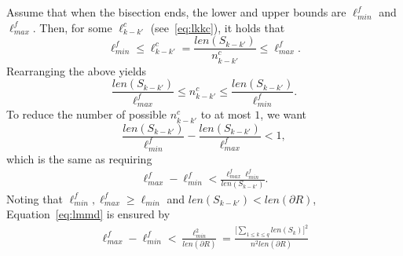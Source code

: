 Assume that when the bisection ends, the lower and upper bounds are 
$\ell_{min}^f$ and $\ell_{max}^f$. Then, for some $\ell_{k-k'}^c$
(see~\eqref{eq:lkkc}), it holds that
\[
\ell_{min}^f \le \ell_{k-k'}^c = \frac{len(S_{k-k'})}{n_{k-k'}^c} \le \ell_{max}^f.
\]
Rearranging the above yields
\[
\frac{len(S_{k-k'})}{\ell_{max}^f} \le n_{k-k'}^c \le \frac{len(S_{k-k'})}{\ell_{min}^f}.
\]
To reduce the number of possible $n_{k-k'}^c$ to at most $1$, we want 
\[
\frac{len(S_{k-k'})}{\ell_{min}^f} - \frac{len(S_{k-k'})}{\ell_{max}^f} < 1, 
\]
which is the same as requiring 
\begin{align}\label{eq:lmmd}
\ell_{max}^f- \ell_{min}^f <
\frac{\ell_{max}^f\ell_{min}^f}{len(S_{k-k'})}. 
\end{align}
Noting that $\ell_{min}^f, \ell_{max}^f \ge  \ell_{min}$ and $len(S_{k-k'}) < 
len (\partial R)$, Equation~\eqref{eq:lmmd} is ensured by 
\begin{align}\label{eq:lmmd2}
\ell_{max}^f- \ell_{min}^f 
< \frac{\ell_{min}^2}{len(\partial R)} 
= \frac{\Big[\sum_{1\le k\le q}len(S_k)\Big]^2}{n^2len(\partial R)} 
\end{align}

